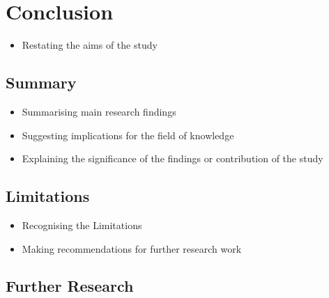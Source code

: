 \chapter{Conclusion}
\label{ch:Conclusion}


\begin{itemize}
    \item Restating the aims of the study
\end{itemize}

\section{Summary}
\label{sec:Conclusion:Summary}
\begin{itemize}
    \item Summarising main research findings
    \item Suggesting implications for the field of knowledge
    \item Explaining the significance of the findings or contribution of the study
\end{itemize}

\section{Limitations}
\label{sec:Conclusion:Limitations}
\begin{itemize}
    \item Recognising the Limitations
    \item Making recommendations for further research work 
\end{itemize}

\section{Further Research}
\label{sec:Conclusion:PossibleExtensions}

